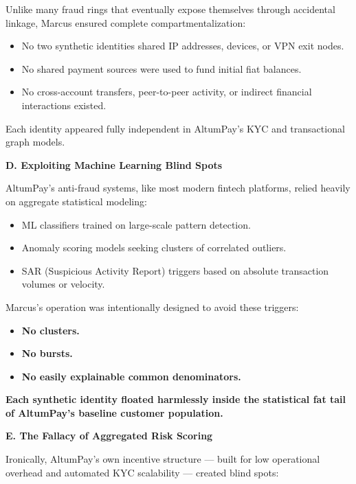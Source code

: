 Unlike many fraud rings that eventually expose themselves through accidental linkage, Marcus ensured complete compartmentalization:

\begin{itemize}
    \item No two synthetic identities shared IP addresses, devices, or VPN exit nodes.
    \item No shared payment sources were used to fund initial fiat balances.
    \item No cross-account transfers, peer-to-peer activity, or indirect financial interactions existed.
\end{itemize}

Each identity appeared fully independent in AltumPay’s KYC and transactional graph models.

\medskip

\textbf{D. Exploiting Machine Learning Blind Spots}

AltumPay’s anti-fraud systems, like most modern fintech platforms, relied heavily on aggregate statistical modeling:

\begin{itemize}
    \item ML classifiers trained on large-scale pattern detection.
    \item Anomaly scoring models seeking clusters of correlated outliers.
    \item SAR (Suspicious Activity Report) triggers based on absolute transaction volumes or velocity.
\end{itemize}

Marcus’s operation was intentionally designed to avoid these triggers:

\begin{itemize}
    \item \textbf{No clusters.}
    \item \textbf{No bursts.}
    \item \textbf{No easily explainable common denominators.}
\end{itemize}

\textbf{Each synthetic identity floated harmlessly inside the statistical fat tail of AltumPay’s baseline customer population.}

\medskip

\textbf{E. The Fallacy of Aggregated Risk Scoring}

Ironically, AltumPay’s own incentive structure --- built for low operational overhead and automated KYC scalability --- created blind spots:

